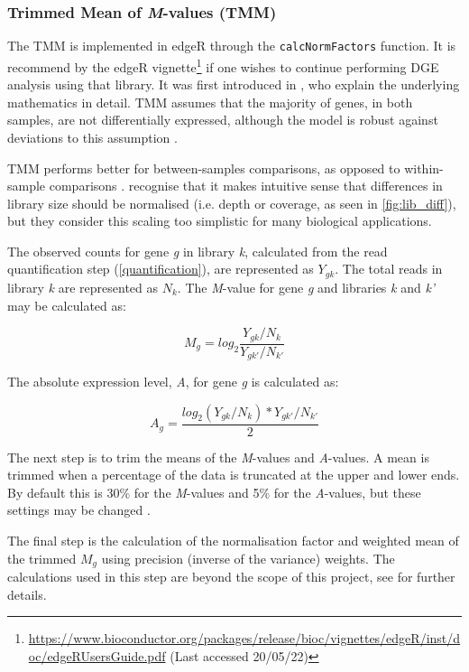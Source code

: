 \subsubsection{Trimmed Mean of \textit{M}-values (TMM)}
\label{TMM}

The \ac{TMM} is implemented in edgeR \citep{edger} through the \texttt{calcNormFactors} function. It is recommend by the edgeR vignette\footnote{\url{https://www.bioconductor.org/packages/release/bioc/vignettes/edgeR/inst/doc/edgeRUsersGuide.pdf} (Last accessed 20/05/22)} if one wishes to continue performing \ac{DGE} analysis using that library. It was first introduced in \cite{robinson2010scaling}, who explain the underlying mathematics in detail. \ac{TMM} assumes that the majority of genes, in both samples, are not differentially expressed, although the model is robust against deviations to this assumption \citep{robinson2010scaling}. 

\ac{TMM} performs better for between-samples comparisons, as opposed to within-sample comparisons \citep{dundar2015introduction}. \cite{robinson2010scaling} recognise that it makes intuitive sense that differences in library size should be normalised (i.e. depth or coverage, as seen in \autoref{fig:lib_diff}), but they consider this scaling too simplistic for many biological applications. 

The observed counts for gene \textit{g} in library \textit{k}, calculated from the read quantification step (\autoref{quantification}), are represented as $Y_{gk}$. The total reads in library \textit{k} are represented as $N_k$. The  \textit{M}-value for gene \textit{g} and libraries \textit{k} and \textit{k'} may be calculated as:

$$ M_g = log_2 \frac{Y_{gk}/N_k}{Y_{gk'}/N_{k'}}$$

The absolute expression level, \textit{A}, for gene \textit{g} is calculated as:

$$A_g = \frac{log_2(Y_{gk}/N_k)*Y_{gk'}/N_{k'}}{2}$$

The next step is to trim the means of the \textit{M}-values and \textit{A}-values. A mean is trimmed when a percentage of the data is truncated at the upper and lower ends. By default this is 30\% for the \textit{M}-values and 5\% for the \textit{A}-values, but these settings may be changed \citep{robinson2010scaling}. 

The final step is the calculation of the normalisation factor and weighted mean of the trimmed $M_g$ using precision (inverse of the variance) weights. The calculations used in this step are beyond the scope of this project, see \cite{robinson2010scaling} for further details. %


